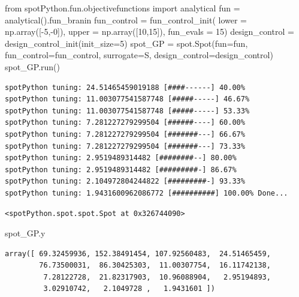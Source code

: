 \documentclass[
  letterpaper,
  DIV=11,
  numbers=noendperiod]{scrreprt}
\newenvironment{Shaded}{\begin{snugshade}}{\end{snugshade}}
\newcommand{\DecValTok}[1]{\textcolor[rgb]{0.68,0.00,0.00}{#1}}
\newcommand{\ImportTok}[1]{\textcolor[rgb]{0.00,0.46,0.62}{#1}}
\newcommand{\NormalTok}[1]{\textcolor[rgb]{0.00,0.23,0.31}{#1}}
\newcommand{\OperatorTok}[1]{\textcolor[rgb]{0.37,0.37,0.37}{#1}}
\begin{document}
\begin{Shaded}
\begin{Highlighting}[]
\ImportTok{from}\NormalTok{ spotPython.fun.objectivefunctions }\ImportTok{import}\NormalTok{ analytical}
\NormalTok{fun }\OperatorTok{=}\NormalTok{ analytical().fun\_branin}
\NormalTok{fun\_control }\OperatorTok{=}\NormalTok{ fun\_control\_init(}
\NormalTok{    lower }\OperatorTok{=}\NormalTok{ np.array([}\OperatorTok{{-}}\DecValTok{5}\NormalTok{,}\OperatorTok{{-}}\DecValTok{0}\NormalTok{]),}
\NormalTok{    upper }\OperatorTok{=}\NormalTok{ np.array([}\DecValTok{10}\NormalTok{,}\DecValTok{15}\NormalTok{]),}
\NormalTok{    fun\_evals }\OperatorTok{=} \DecValTok{15}\NormalTok{)    }
\NormalTok{design\_control }\OperatorTok{=}\NormalTok{ design\_control\_init(init\_size}\OperatorTok{=}\DecValTok{5}\NormalTok{)}
\NormalTok{spot\_GP }\OperatorTok{=}\NormalTok{ spot.Spot(fun}\OperatorTok{=}\NormalTok{fun, }
\NormalTok{                    fun\_control}\OperatorTok{=}\NormalTok{fun\_control,}
\NormalTok{                    surrogate}\OperatorTok{=}\NormalTok{S, }
\NormalTok{                    design\_control}\OperatorTok{=}\NormalTok{design\_control)}
\NormalTok{spot\_GP.run()}
\end{Highlighting}
\end{Shaded}

\begin{verbatim}
spotPython tuning: 24.51465459019188 [####------] 40.00% 
spotPython tuning: 11.003077541587748 [#####-----] 46.67% 
spotPython tuning: 11.003077541587748 [#####-----] 53.33% 
spotPython tuning: 7.281227279299504 [######----] 60.00% 
spotPython tuning: 7.281227279299504 [#######---] 66.67% 
spotPython tuning: 7.281227279299504 [#######---] 73.33% 
spotPython tuning: 2.9519489314482 [########--] 80.00% 
spotPython tuning: 2.9519489314482 [#########-] 86.67% 
spotPython tuning: 2.104972804244822 [#########-] 93.33% 
spotPython tuning: 1.9431600962086772 [##########] 100.00% Done...
\end{verbatim}

\begin{verbatim}
<spotPython.spot.spot.Spot at 0x326744090>
\end{verbatim}

\begin{Shaded}
\begin{Highlighting}[]
\NormalTok{spot\_GP.y}
\end{Highlighting}
\end{Shaded}

\begin{verbatim}
array([ 69.32459936, 152.38491454, 107.92560483,  24.51465459,
        76.73500031,  86.30425303,  11.00307754,  16.11742138,
         7.28122728,  21.82317903,  10.96088904,   2.95194893,
         3.02910742,   2.1049728 ,   1.9431601 ])
\end{verbatim}
\end{document}
